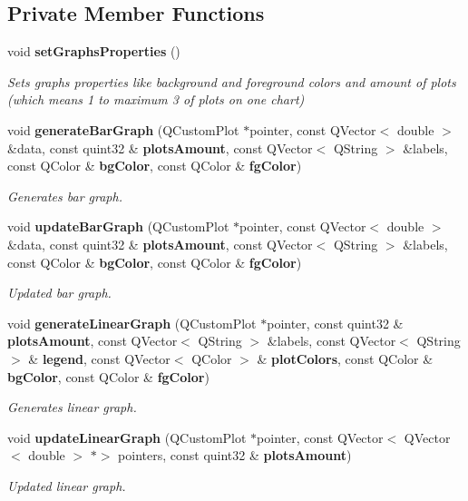 \subsection*{Private Member Functions}
\begin{DoxyCompactItemize}
\item 
void \textbf{ set\+Graphs\+Properties} ()
\begin{DoxyCompactList}\small\item\em Sets graphs properties like background and foreground colors and amount of plots (which means 1 to maximum 3 of plots on one chart) \end{DoxyCompactList}\item 
void \textbf{ generate\+Bar\+Graph} (Q\+Custom\+Plot $\ast$pointer, const Q\+Vector$<$ double $>$ \&data, const quint32 \&\textbf{ plots\+Amount}, const Q\+Vector$<$ Q\+String $>$ \&labels, const Q\+Color \&\textbf{ bg\+Color}, const Q\+Color \&\textbf{ fg\+Color})
\begin{DoxyCompactList}\small\item\em Generates bar graph. \end{DoxyCompactList}\item 
void \textbf{ update\+Bar\+Graph} (Q\+Custom\+Plot $\ast$pointer, const Q\+Vector$<$ double $>$ \&data, const quint32 \&\textbf{ plots\+Amount}, const Q\+Vector$<$ Q\+String $>$ \&labels, const Q\+Color \&\textbf{ bg\+Color}, const Q\+Color \&\textbf{ fg\+Color})
\begin{DoxyCompactList}\small\item\em Updated bar graph. \end{DoxyCompactList}\item 
void \textbf{ generate\+Linear\+Graph} (Q\+Custom\+Plot $\ast$pointer, const quint32 \&\textbf{ plots\+Amount}, const Q\+Vector$<$ Q\+String $>$ \&labels, const Q\+Vector$<$ Q\+String $>$ \&\textbf{ legend}, const Q\+Vector$<$ Q\+Color $>$ \&\textbf{ plot\+Colors}, const Q\+Color \&\textbf{ bg\+Color}, const Q\+Color \&\textbf{ fg\+Color})
\begin{DoxyCompactList}\small\item\em Generates linear graph. \end{DoxyCompactList}\item 
void \textbf{ update\+Linear\+Graph} (Q\+Custom\+Plot $\ast$pointer, const Q\+Vector$<$ Q\+Vector$<$ double $>$ $\ast$$>$ pointers, const quint32 \&\textbf{ plots\+Amount})
\begin{DoxyCompactList}\small\item\em Updated linear graph. \end{DoxyCompactList}\item 
$$
\end{DoxyCompactItemize}
